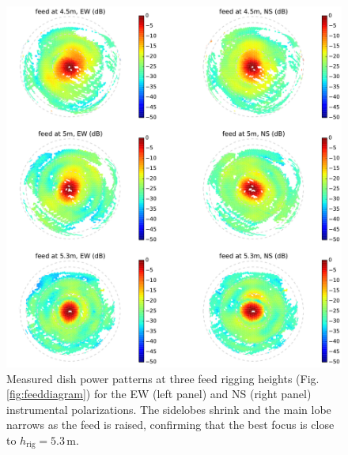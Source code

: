 \begin{figure}[t]
\centering
\includegraphics[width=6in]{chap3_hera_beammapping/measured_beams_and_models_maps.pdf}
\caption[Measured dish power patterns at three feed rigging heights.]{Measured dish power patterns at three feed rigging heights (Fig. \ref{fig:feeddiagram}) for the EW (left panel) and NS (right panel) instrumental polarizations. The sidelobes shrink and the main lobe narrows as the feed is raised, confirming that the best focus is close to $h_\text{rig}=5.3$\,m.}
\label{fig:measuredbeammaps}
\end{figure}

